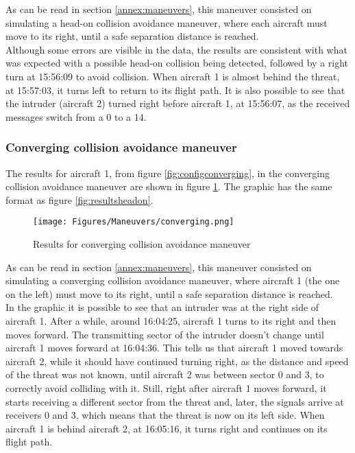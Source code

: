 As can be read in section \ref{annex:maneuvers}, this maneuver consisted on simulating a head-on collision avoidance maneuver, where each aircraft must move to its right, until a safe separation distance is reached.\\
Although some errors are visible in the data, the results are consistent with what was expected with a possible head-on collision being detected, followed by a right turn at 15:56:09 to avoid collision. When aircraft 1 is almost behind the threat, at 15:57:03, it turns left to return to its flight path. It is also possible to see that the intruder (aircraft 2) turned right before aircraft 1, at 15:56:07, as the received messages switch from a 0 to a 14.\\

\subsubsection{Converging collision avoidance maneuver}
The results for aircraft 1, from figure \ref{fig:configconverging}, in the converging collision avoidance maneuver are shown in figure \ref{fig:resultsconverging}. The graphic has the same format as figure \ref{fig:resultsheadon}.\\

\begin{figure}[!ht]
  \centering
  \texttt{[image: Figures/Maneuvers/converging.png]}
  \caption[Results for Converging Collision Avoidance Maneuver]{Results for converging collision avoidance maneuver}
  \label{fig:resultsconverging}
\end{figure}

As can be read in section \ref{annex:maneuvers}, this maneuver consisted on simulating a converging collision avoidance maneuver, where aircraft 1 (the one on the left) must move to its right, until a safe separation distance is reached.\\ 
In the graphic it is possible to see that an intruder was at the right side of aircraft 1. After a while, around 16:04:25, aircraft 1 turns to its right and then moves forward. The transmitting sector of the intruder doesn't change until aircraft 1 moves forward at 16:04:36. This tells us that aircraft 1 moved towards aircraft 2, while it should have continued turning right, as the distance and speed of the threat was not known, until aircraft 2 was between sector 0 and 3, to correctly avoid colliding with it. Still, right after aircraft 1 moves forward, it starts receiving a different sector from the threat and, later, the signals arrive at receivers 0 and 3, which means that the threat is now on its left side. When aircraft 1 is behind aircraft 2, at 16:05:16, it turns right and continues on its flight path.\\

